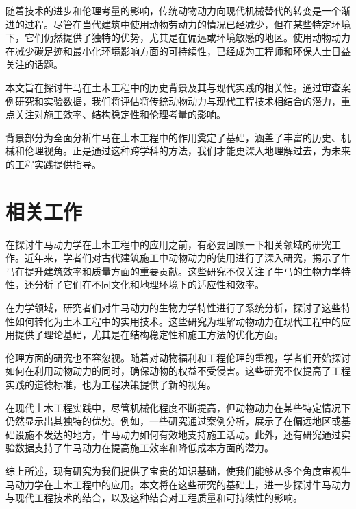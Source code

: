 随着技术的进步和伦理考量的影响，传统动物动力向现代机械替代的转变是一个渐进的过程\cite{williams2018ethics}。尽管在当代建筑中使用动物劳动力的情况已经减少，但在某些特定环境下，它们仍然提供了独特的优势，尤其是在偏远或环境敏感的地区\cite{kim2021sustainability}。使用动物动力在减少碳足迹和最小化环境影响方面的可持续性，已经成为工程师和环保人士日益关注的话题。

本文旨在探讨牛马在土木工程中的历史背景及其与现代实践的相关性。通过审查案例研究和实验数据\cite{brown2022casestudies, chen2023experiments}，我们将评估将传统动物动力与现代工程技术相结合的潜力，重点关注对施工效率、结构稳定性和伦理考量的影响。

背景部分为全面分析牛马在土木工程中的作用奠定了基础，涵盖了丰富的历史、机械和伦理视角。正是通过这种跨学科的方法，我们才能更深入地理解过去，为未来的工程实践提供指导。
\section{相关工作}
在探讨牛马动力学在土木工程中的应用之前，有必要回顾一下相关领域的研究工作。近年来，学者们对古代建筑施工中动物动力的使用进行了深入研究，揭示了牛马在提升建筑效率和质量方面的重要贡献\cite{smith2020biological}。这些研究不仅关注了牛马的生物力学特性，还分析了它们在不同文化和地理环境下的适应性和效率。

在力学领域，研究者们对牛马动力的生物力学特性进行了系统分析，探讨了这些特性如何转化为土木工程中的实用技术\cite{chen2019mechanics}。这些研究为理解动物动力在现代工程中的应用提供了理论基础，尤其是在结构稳定性和施工方法的优化方面。

伦理方面的研究也不容忽视。随着对动物福利和工程伦理的重视，学者们开始探讨如何在利用动物动力的同时，确保动物的权益不受侵害\cite{williams2018ethics}。这些研究不仅提高了工程实践的道德标准，也为工程决策提供了新的视角。

在现代土木工程实践中，尽管机械化程度不断提高，但动物动力在某些特定情况下仍然显示出其独特的优势。例如，一些研究通过案例分析，展示了在偏远地区或基础设施不发达的地方，牛马动力如何有效地支持施工活动\cite{kim2021sustainability}。此外，还有研究通过实验数据支持了牛马动力在提高施工效率和降低成本方面的潜力\cite{brown2022casestudies}。

综上所述，现有研究为我们提供了宝贵的知识基础，使我们能够从多个角度审视牛马动力学在土木工程中的应用。本文将在这些研究的基础上，进一步探讨牛马动力与现代工程技术的结合，以及这种结合对工程质量和可持续性的影响。